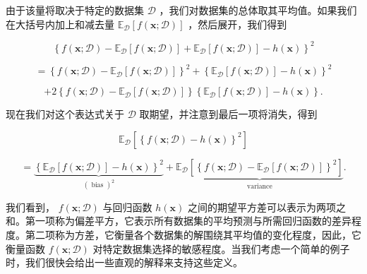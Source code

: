 \documentclass[10pt]{report}
\begin{document}
由于该量将取决于特定的数据集 \(\mathcal{D}\) ，我们对数据集的总体取其平均值。如果我们在大括号内加上和减去量 \({\mathbb{E}}_{\mathcal{D}}\left\lbrack  {f\left( {\mathbf{x};\mathcal{D}}\right) }\right\rbrack\) ，然后展开，我们得到

\[
{\left\{  f\left( \mathbf{x};\mathcal{D}\right)  - {\mathbb{E}}_{\mathcal{D}}\left\lbrack  f\left( \mathbf{x};\mathcal{D}\right) \right\rbrack   + {\mathbb{E}}_{\mathcal{D}}\left\lbrack  f\left( \mathbf{x};\mathcal{D}\right) \right\rbrack   - h\left( \mathbf{x}\right) \right\}  }^{2}
\]

\[
= {\left\{  f\left( \mathbf{x};\mathcal{D}\right)  - {\mathbb{E}}_{\mathcal{D}}\left\lbrack  f\left( \mathbf{x};\mathcal{D}\right) \right\rbrack  \right\}  }^{2} + {\left\{  {\mathbb{E}}_{\mathcal{D}}\left\lbrack  f\left( \mathbf{x};\mathcal{D}\right) \right\rbrack   - h\left( \mathbf{x}\right) \right\}  }^{2}
\]

\[
+ 2\left\{  {f\left( {\mathbf{x};\mathcal{D}}\right)  - {\mathbb{E}}_{\mathcal{D}}\left\lbrack  {f\left( {\mathbf{x};\mathcal{D}}\right) }\right\rbrack  }\right\}  \left\{  {{\mathbb{E}}_{\mathcal{D}}\left\lbrack  {f\left( {\mathbf{x};\mathcal{D}}\right) }\right\rbrack   - h\left( \mathbf{x}\right) }\right\}  . \tag{4.44}
\]

现在我们对这个表达式关于 \(\mathcal{D}\) 取期望，并注意到最后一项将消失，得到

\[
{\mathbb{E}}_{\mathcal{D}}\left\lbrack  {\left\{  f\left( \mathbf{x};\mathcal{D}\right)  - h\left( \mathbf{x}\right) \right\}  }^{2}\right\rbrack
\]

\[
= \underset{{\left( \text{ bias }\right) }^{2}}{\underbrace{{\left\{  {\mathbb{E}}_{\mathcal{D}}\left\lbrack  f\left( \mathbf{x};\mathcal{D}\right) \right\rbrack   - h\left( \mathbf{x}\right) \right\}  }^{2}}} + \underset{\text{ variance }}{\underbrace{{\mathbb{E}}_{\mathcal{D}}\left\lbrack  {\left\{  f\left( \mathbf{x};\mathcal{D}\right)  - {\mathbb{E}}_{\mathcal{D}}\left\lbrack  f\left( \mathbf{x};\mathcal{D}\right) \right\rbrack  \right\}  }^{2}\right\rbrack  }}. \tag{4.45}
\]

我们看到， \(f\left( {\mathbf{x};\mathcal{D}}\right)\) 与回归函数 \(h\left( \mathbf{x}\right)\) 之间的期望平方差可以表示为两项之和。第一项称为偏差平方，它表示所有数据集的平均预测与所需回归函数的差异程度。第二项称为方差，它衡量各个数据集的解围绕其平均值的变化程度，因此，它衡量函数 \(f\left( {\mathbf{x};\mathcal{D}}\right)\) 对特定数据集选择的敏感程度。当我们考虑一个简单的例子时，我们很快会给出一些直观的解释来支持这些定义。
\end{document}
